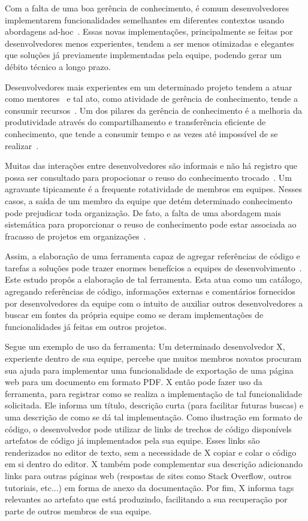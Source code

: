Com a falta de uma boa gerência de conhecimento, é comum desenvolvedores implementarem funcionalidades semelhantes em diferentes contextos usando abordagens ad-hoc~\cite{SangMok2011}. Essas novas implementações, principalmente se feitas por desenvolvedores menos experientes, tendem a ser menos otimizadas e elegantes que soluções já previamente implementadas pela equipe, podendo gerar um débito técnico a longo prazo.

Desenvolvedores mais experientes em um determinado projeto tendem a atuar como mentores~\cite{CubraniC2004} e tal ato, como atividade de gerência de conhecimento, tende a consumir recursos~\cite{Wiig2003}. Um dos pilares da gerência de conhecimento é a melhoria da produtividade através do compartilhamento e transferência eficiente de conhecimento, que tende a consumir tempo e as vezes até impossível de se realizar~\cite{Levy2009}.

Muitas das interações entre desenvolvedores são informais e não há registro que possa ser consultado para propocionar o reuso do conhecimento trocado~\cite{Olson2000}. Um agravante tipicamente é a frequente rotatividade de membros em equipes. Nesses casos, a saída de um membro da equipe que detém determinado conhecimento pode prejudicar toda organização. De fato, a falta de uma abordagem mais sistemática para proporcionar o reuso de conhecimento pode estar associada ao fracasso de projetos em organizações~\cite{Hall2008}.

Assim, a elaboração de uma ferramenta capaz de agregar referências de código e tarefas a soluções pode trazer enormes benefícios a equipes de desenvolvimento~\cite{CubraniC2004}. Este estudo propôs a elaboração de tal ferramenta. Esta atua como um catálogo, agregando referências de código, informações externas e comentários fornecidos por desenvolvedores da equipe com o intuito de auxiliar outros desenvolvedores a buscar em fontes da própria equipe como se deram implementações de funcionalidades já feitas em outros projetos.

Segue um exemplo de uso da ferramenta: Um determinado desenvolvedor X, experiente dentro de sua equipe, percebe que muitos membros novatos procuram sua ajuda para implementar uma funcionalidade de exportação de uma página web para um documento em formato PDF. X então pode fazer uso da ferramenta, para registrar como se realiza a implementação de tal funcionalidade solicitada. Ele informa um título, descrição curta (para facilitar futuras buscas) e uma descrição de como se dá tal implementação. Como ilustração em formato de código, o desenvolvedor pode utilizar de links de trechos de código disponívels artefatos de código já implementados pela sua equipe. Esses links são renderizados no editor de texto, sem a necessidade de X copiar e colar o código em si dentro do editor. X também pode complementar sua descrição adicionando links para outras páginas web (respostas de sites como Stack Overflow, outros tutoriais, etc...) em forma de anexo da documentação. Por fim, X informa tags relevantes ao artefato que está produzindo, facilitando a sua recuperação por parte de outros membros de sua equipe.

